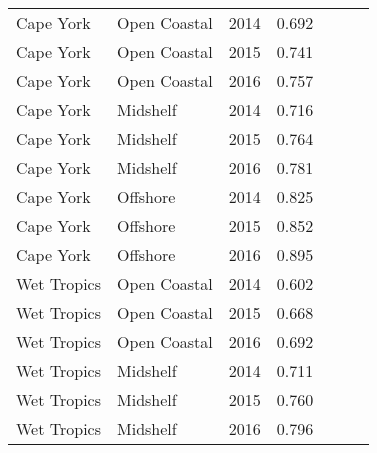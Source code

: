 {\begin{longtable}{llccccc}
\endfoot
Cape York & Open Coastal & 2014 & 0.692 & \cellcolor[HTML]{B0D235}{B} & \cellcolor[HTML]{B0D235}{B} & \cellcolor[HTML]{B0D235}{B} \\ 
  Cape York & Open Coastal & 2015 & 0.741 & \cellcolor[HTML]{B0D235}{B} & \cellcolor[HTML]{B0D235}{B} & \cellcolor[HTML]{B0D235}{B} \\ 
  Cape York & Open Coastal & 2016 & 0.757 & \cellcolor[HTML]{B0D235}{B} & \cellcolor[HTML]{B0D235}{B} & \cellcolor[HTML]{B0D235}{B} \\ 
  Cape York & Midshelf & 2014 & 0.716 & \cellcolor[HTML]{B0D235}{B} & \cellcolor[HTML]{B0D235}{B} & \cellcolor[HTML]{B0D235}{B} \\ 
  Cape York & Midshelf & 2015 & 0.764 & \cellcolor[HTML]{B0D235}{B} & \cellcolor[HTML]{B0D235}{B} & \cellcolor[HTML]{B0D235}{B} \\ 
  Cape York & Midshelf & 2016 & 0.781 & \cellcolor[HTML]{B0D235}{B} & \cellcolor[HTML]{B0D235}{B} & \cellcolor[HTML]{B0D235}{B} \\ 
  Cape York & Offshore & 2014 & 0.825 & \cellcolor[HTML]{B0D235}{B} & \cellcolor[HTML]{00734D}{A} & \cellcolor[HTML]{B0D235}{B} \\ 
  Cape York & Offshore & 2015 & 0.852 & \cellcolor[HTML]{00734D}{A} & \cellcolor[HTML]{00734D}{A} & \cellcolor[HTML]{00734D}{A} \\ 
  Cape York & Offshore & 2016 & 0.895 & \cellcolor[HTML]{00734D}{A} & \cellcolor[HTML]{00734D}{A} & \cellcolor[HTML]{00734D}{A} \\ 
  Wet Tropics & Open Coastal & 2014 & 0.602 & \cellcolor[HTML]{F0C918}{C} & \cellcolor[HTML]{B0D235}{B} & \cellcolor[HTML]{F0C918}{C} \\ 
  Wet Tropics & Open Coastal & 2015 & 0.668 & \cellcolor[HTML]{B0D235}{B} & \cellcolor[HTML]{B0D235}{B} & \cellcolor[HTML]{B0D235}{B} \\ 
  Wet Tropics & Open Coastal & 2016 & 0.692 & \cellcolor[HTML]{B0D235}{B} & \cellcolor[HTML]{B0D235}{B} & \cellcolor[HTML]{B0D235}{B} \\ 
  Wet Tropics & Midshelf & 2014 & 0.711 & \cellcolor[HTML]{B0D235}{B} & \cellcolor[HTML]{B0D235}{B} & \cellcolor[HTML]{B0D235}{B} \\ 
  Wet Tropics & Midshelf & 2015 & 0.760 & \cellcolor[HTML]{B0D235}{B} & \cellcolor[HTML]{B0D235}{B} & \cellcolor[HTML]{B0D235}{B} \\ 
  Wet Tropics & Midshelf & 2016 & 0.796 & \cellcolor[HTML]{B0D235}{B} & \cellcolor[HTML]{B0D235}{B} & \cellcolor[HTML]{B0D235}{B} \\ 

\end{longtable}}
